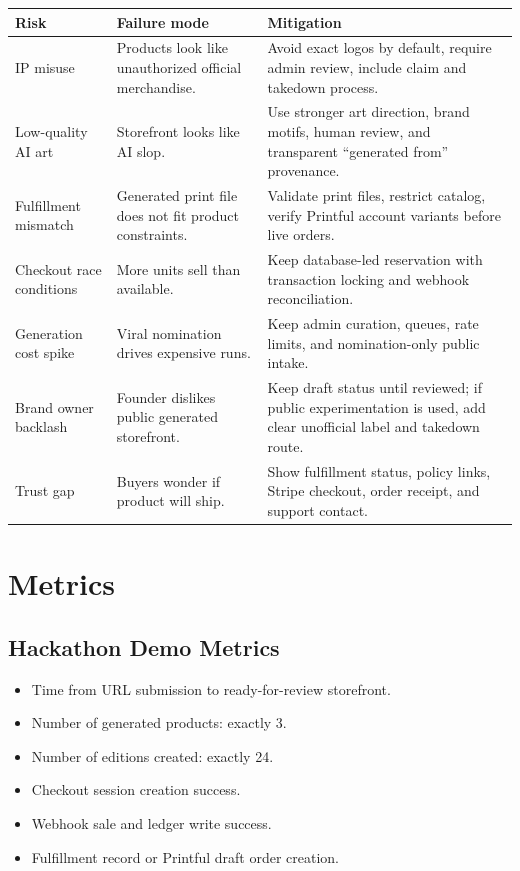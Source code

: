 \documentclass[11pt]{article}
\begin{document}
\begin{longtable}{p{}p{}p{}}
\toprule
\textbf{Risk} & \textbf{Failure mode} & \textbf{Mitigation} \\
\midrule
\endhead
IP misuse & Products look like unauthorized official merchandise. & Avoid exact logos by default, require admin review, include claim and takedown process. \\
Low-quality AI art & Storefront looks like AI slop. & Use stronger art direction, brand motifs, human review, and transparent ``generated from'' provenance. \\
Fulfillment mismatch & Generated print file does not fit product constraints. & Validate print files, restrict catalog, verify Printful account variants before live orders. \\
Checkout race conditions & More units sell than available. & Keep database-led reservation with transaction locking and webhook reconciliation. \\
Generation cost spike & Viral nomination drives expensive runs. & Keep admin curation, queues, rate limits, and nomination-only public intake. \\
Brand owner backlash & Founder dislikes public generated storefront. & Keep draft status until reviewed; if public experimentation is used, add clear unofficial label and takedown route. \\
Trust gap & Buyers wonder if product will ship. & Show fulfillment status, policy links, Stripe checkout, order receipt, and support contact. \\
\bottomrule
\end{longtable}

\section{Metrics}

\subsection{Hackathon Demo Metrics}

\begin{itemize}
  \item Time from URL submission to ready-for-review storefront.
  \item Number of generated products: exactly 3.
  \item Number of editions created: exactly 24.
  \item Checkout session creation success.
  \item Webhook sale and ledger write success.
  \item Fulfillment record or Printful draft order creation.
\end{itemize}
\end{document}
